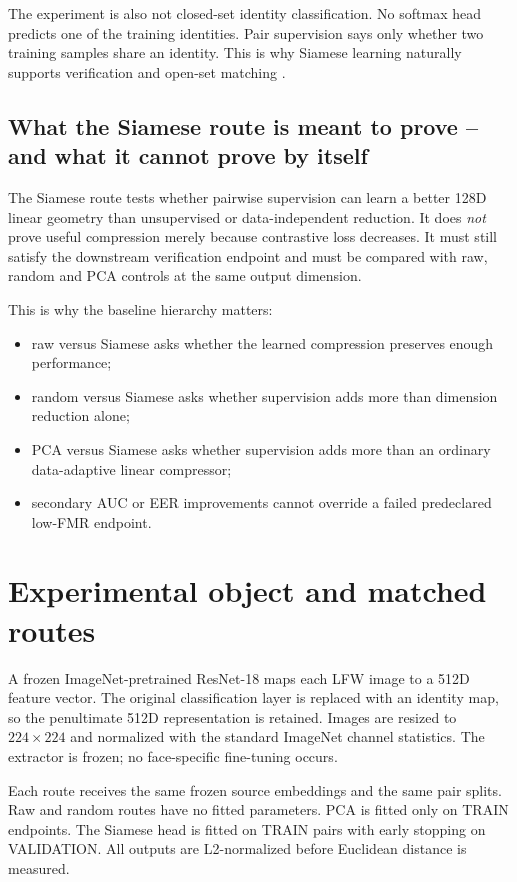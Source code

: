 \documentclass[10pt,a4paper]{article}
\begin{document}
The experiment is also not closed-set identity classification. No softmax head predicts one
of the training identities. Pair supervision says only whether two training samples share an
identity. This is why Siamese learning naturally supports verification and open-set matching
\cite{bromley1993,koch2015}.

\subsection{What the Siamese route is meant to prove -- and what it cannot prove by itself}

The Siamese route tests whether pairwise supervision can learn a better 128D linear geometry
than unsupervised or data-independent reduction. It does \emph{not} prove useful compression
merely because contrastive loss decreases. It must still satisfy the downstream verification
endpoint and must be compared with raw, random and PCA controls at the same output dimension.

This is why the baseline hierarchy matters:
\begin{itemize}
\item raw versus Siamese asks whether the learned compression preserves enough performance;
\item random versus Siamese asks whether supervision adds more than dimension reduction alone;
\item PCA versus Siamese asks whether supervision adds more than an ordinary data-adaptive linear compressor;
\item secondary AUC or EER improvements cannot override a failed predeclared low-FMR endpoint.
\end{itemize}

\section{Experimental object and matched routes}\label{sec:object}

A frozen ImageNet-pretrained ResNet-18 maps each LFW image to a 512D feature vector. The
original classification layer is replaced with an identity map, so the penultimate 512D
representation is retained. Images are resized to $224\times224$ and normalized with the
standard ImageNet channel statistics. The extractor is frozen; no face-specific fine-tuning
occurs.

Each route receives the same frozen source embeddings and the same pair splits. Raw and
random routes have no fitted parameters. PCA is fitted only on TRAIN endpoints. The Siamese
head is fitted on TRAIN pairs with early stopping on VALIDATION. All outputs are L2-normalized
before Euclidean distance is measured.
\end{document}
